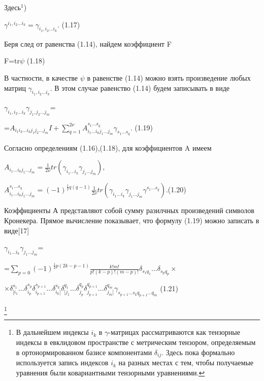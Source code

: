 \documentclass{article}
\begin{document}
{\begin{center}
\end{center}
Здесь$^1$)\par
\begin{center}
$\gamma^{i_1,i_2\dots i_k}=\gamma_{i_1,i_2\dots i_k}.$ (1.17)\par
\end{center}
Беря след от равенства (1.14), найдем коэффициент F\par
\begin{center}
F=tr$\psi$ (1.18)
\end{center}
В частности, в качестве $\psi$ в равенстве (1.14) можно взять произведение любых матриц $\gamma_{i_1,i_2\dots i_k}$. В этом случае равенство (1.14) будем записывать в виде\par
$\gamma_{i_1,i_2\dots i_k}\gamma_{j_1,j_2\dots j_m}$=\par
\begin{center}
=$A_{i_1 i_2\dots i_k j_1 j_2\dots j_m}I+\sum_{q=1}^{2\nu}A_{i_1\dots i_k j_1\dots j_m}^{s_1 \dots s_q}\gamma_{s_1\dots s_q}$. (1.19)\par
\end{center}
Согласно определениям (1.16),(1.18), для коэффициентов A имеем\par
$A_{i_1 \dots i_k j_1 \dots j_m}=\frac{1}{2\nu}tr(\gamma_{i_1 \dots i_k}\gamma_{j_1\dots j_m})$,\par
$A_{i_1\dots i_k j_1\dots j_m}^{s_1 \dots s_q}=(-1)^{\frac{1}{2}q(q-1)}\frac{1}{2\nu}tr(\gamma_{i_1 \dots i_k}\gamma_{j_1\dots j_m}\gamma^{s_1\dots s_q}).$(1.20)\par
Коэффициенты А представляют собой сумму разилчных произведений символов Кронекера. Прямое вычисление показывает, что формулу (1.19) можно записать в виде[17]\par
$\gamma_{i_1 \dots i_k}\gamma_{j_1 \dots j_m}$=\par
=$\sum_{p=0}(-1)^{\frac{1}{2}p(2k-p-1)}\frac{k!m!}{p!(k-p)!(m-p)!}\delta_{s_1 q_1} \dots \delta_{s_p q_p}\times$\par
$\times\delta_{[i_1}^{s_1}\dots\delta_{i_p}^{s_p}\delta_{i_{p+1}}^{s_{p+1}}\dots\delta_{i_k]}^{s_k}\delta_{[j_1}^{q_1}\dots\delta_{j_p}^{q_p}\delta_{j_{p+1}}^{q_{p+1}}\dots\delta_{j_m]}^{q_m}\gamma_{s_{p+1}\dots s_k q_{p+1} \dots q_m}$ (1.21)\par
\footnote[1]{В дальнейшем индексы $i_k$ в $\gamma$-матрицах рассматриваются как тензорные индексы в евклидовом пространстве с метрическим тензором, определяемым в ортонормированном базисе компонентами $\delta_{ij}$. Здесь пока формально используется запись индексов $i_k$ на разных местах с тем, чтобы получаемые уравнения были ковариантными тензорными уравнениями.}\nopagebreak\par
}
\end{document}
